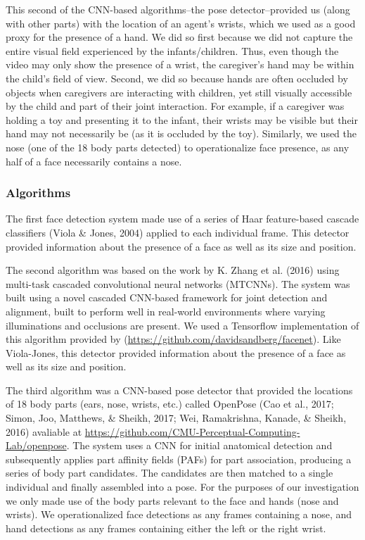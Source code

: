 \documentclass[10pt, letterpaper]{article}
\begin{document}
This second of the CNN-based algorithms--the pose detector--provided us
(along with other parts) with the location of an agent's wrists, which
we used as a good proxy for the presence of a hand. We did so first
because we did not capture the entire visual field experienced by the
infants/children. Thus, even though the video may only show the presence
of a wrist, the caregiver's hand may be within the child's field of
view. Second, we did so because hands are often occluded by objects when
caregivers are interacting with children, yet still visually accessible
by the child and part of their joint interaction. For example, if a
caregiver was holding a toy and presenting it to the infant, their
wrists may be visible but their hand may not necessarily be (as it is
occluded by the toy). Similarly, we used the nose (one of the 18 body
parts detected) to operationalize face presence, as any half of a face
necessarily contains a nose.

\subsubsection{Algorithms}\label{algorithms}

The first face detection system made use of a series of Haar
feature-based cascade classifiers (Viola \& Jones, 2004) applied to each
individual frame. This detector provided information about the presence
of a face as well as its size and position.

The second algorithm was based on the work by K. Zhang et al. (2016)
using multi-task cascaded convolutional neural networks (MTCNNs). The
system was built using a novel cascaded CNN-based framework for joint
detection and alignment, built to perform well in real-world
environments where varying illuminations and occlusions are present. We
used a Tensorflow implementation of this algorithm provided by
(\url{https://github.com/davidsandberg/facenet}). Like Viola-Jones, this
detector provided information about the presence of a face as well as
its size and position.

The third algorithm was a CNN-based pose detector that provided the
locations of 18 body parts (ears, nose, wrists, etc.) called OpenPose
(Cao et al., 2017; Simon, Joo, Matthews, \& Sheikh, 2017; Wei,
Ramakrishna, Kanade, \& Sheikh, 2016) avaliable at
\url{https://github.com/CMU-Perceptual-Computing-Lab/openpose}. The
system uses a CNN for initial anatomical detection and subsequently
applies part affinity fields (PAFs) for part association, producing a
series of body part candidates. The candidates are then matched to a
single individual and finally assembled into a pose. For the purposes of
our investigation we only made use of the body parts relevant to the
face and hands (nose and wrists). We operationalized face detections as
any frames containing a nose, and hand detections as any frames
containing either the left or the right wrist.
\end{document}
